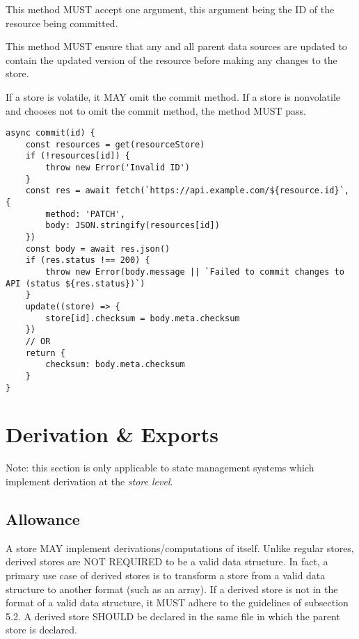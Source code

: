 \documentclass{article}
\begin{document}
This method MUST accept one argument, this argument being the ID of the resource being committed.

This method MUST ensure that any and all parent data sources are updated to contain the updated version of the resource before making any changes to the store.

If a store is volatile, it MAY omit the commit method. If a store is nonvolatile and chooses not to omit the commit method, the method MUST pass.

\begin{lstlisting}[caption=Commit Method]
async commit(id) {
    const resources = get(resourceStore)
    if (!resources[id]) {
        throw new Error('Invalid ID')
    }
    const res = await fetch(`https://api.example.com/${resource.id}`, {
        method: 'PATCH',
        body: JSON.stringify(resources[id])
    })
    const body = await res.json()
    if (res.status !== 200) {
        throw new Error(body.message || `Failed to commit changes to API (status ${res.status})`)
    }
    update((store) => {
        store[id].checksum = body.meta.checksum
    })
    // OR
    return {
        checksum: body.meta.checksum
    }
}
\end{lstlisting}

\section{Derivation \& Exports}
Note: this section is only applicable to state management systems which implement derivation at the \emph{store level}.

\subsection{Allowance}
A store MAY implement derivations/computations of itself. Unlike regular stores, derived stores are NOT REQUIRED to be a valid data structure. In fact, a primary use case of derived stores is to transform a store from a valid data structure to another format (such as an array). If a derived store is not in the format of a valid data structure, it MUST adhere to the guidelines of subsection 5.2. A derived store SHOULD be declared in the same file in which the parent store is declared.
\end{document}
